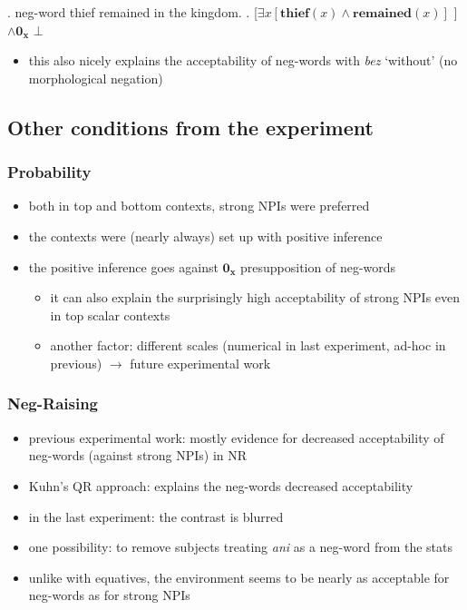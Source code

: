 \documentclass[
  letterpaper,
  DIV=11,
  numbers=noendperiod]{scrartcl}
\providecommand{\tightlist}{%
  \setlength{\itemsep}{0pt}\setlength{\parskip}{0pt}}\usepackage{longtable,booktabs,array}
\begin{document}
\ex. neg-word thief remained in the kingdom. \a.
{[}\(\exists x[\mathbf{thief}(x) \wedge \mathbf{remained}(x)]\) {]}
\(\wedge \mathbf{0_x}\) \hfill \(\bot\)

\begin{itemize}
\tightlist
\item
  this also nicely explains the acceptability of neg-words with
  \emph{bez} `without' (no morphological negation)
\end{itemize}

\hypertarget{other-conditions-from-the-experiment-1}{%
\subsection{Other conditions from the
experiment}\label{other-conditions-from-the-experiment-1}}

\hypertarget{probability}{%
\subsubsection{Probability}\label{probability}}

\begin{itemize}
\tightlist
\item
  both in top and bottom contexts, strong NPIs were preferred
\item
  the contexts were (nearly always) set up with positive inference
\item
  the positive inference goes against \(\mathbf{0_x}\) presupposition of
  neg-words

  \begin{itemize}
  \tightlist
  \item
    it can also explain the surprisingly high acceptability of strong
    NPIs even in top scalar contexts
  \item
    another factor: different scales (numerical in last experiment,
    ad-hoc in previous) \(\rightarrow\) future experimental work
  \end{itemize}
\end{itemize}

\hypertarget{neg-raising-1}{%
\subsubsection{Neg-Raising}\label{neg-raising-1}}

\begin{itemize}
\tightlist
\item
  previous experimental work: mostly evidence for decreased
  acceptability of neg-words (against strong NPIs) in NR
\item
  Kuhn's QR approach: explains the neg-words decreased acceptability
\item
  in the last experiment: the contrast is blurred
\item
  one possibility: to remove subjects treating \emph{ani} as a neg-word
  from the stats
\item
  unlike with equatives, the environment seems to be nearly as
  acceptable for neg-words as for strong NPIs
\end{itemize}
\end{document}

